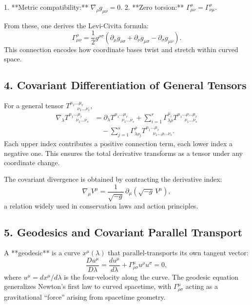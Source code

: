\documentclass[11pt,oneside]{book}
\numberwithin{equation}{chapter}
\begin{document}
1. **Metric compatibility:** $\nabla_\rho g_{\mu\nu} = 0$.  
2. **Zero torsion:** $\Gamma^\rho_{\mu\nu} = \Gamma^\rho_{\nu\mu}$.

From these, one derives the Levi-Civita formula:
\begin{equation}
\Gamma^\rho_{\mu\nu}
= \frac{1}{2} g^{\rho\sigma}
(\partial_\mu g_{\nu\sigma}
+ \partial_\nu g_{\mu\sigma}
- \partial_\sigma g_{\mu\nu}).
\end{equation}
This connection encodes how coordinate bases twist and stretch within curved space.

\subsection*{4. Covariant Differentiation of General Tensors}

For a general tensor $T^{\mu_1\ldots \mu_r}_{\ \ \ \ \ \ \ \nu_1\ldots\nu_s}$,
\begin{align}
\nabla_\lambda
T^{\mu_1\ldots \mu_r}_{\ \ \ \ \ \ \ \nu_1\ldots\nu_s}
&=
\partial_\lambda
T^{\mu_1\ldots \mu_r}_{\ \ \ \ \ \ \ \nu_1\ldots\nu_s}
+ \sum_{i=1}^r
\Gamma^{\mu_i}_{\lambda\rho}
T^{\mu_1\ldots \rho \ldots \mu_r}_{\ \ \ \ \ \ \ \nu_1\ldots\nu_s} \\
&\quad
- \sum_{j=1}^s
\Gamma^{\rho}_{\lambda\nu_j}
T^{\mu_1\ldots \mu_r}_{\ \ \ \ \ \ \ \nu_1\ldots \rho \ldots\nu_s}.
\end{align}
Each upper index contributes a positive connection term, each lower index a negative one.  
This ensures the total derivative transforms as a tensor under any coordinate change.

The covariant divergence is obtained by contracting the derivative index:
\begin{equation}
\nabla_\mu V^\mu = \frac{1}{\sqrt{-g}}\,
\partial_\mu(\sqrt{-g}\,V^\mu),
\end{equation}
a relation widely used in conservation laws and action principles.

\subsection*{5. Geodesics and Covariant Parallel Transport}

A **geodesic** is a curve $x^\mu(\lambda)$ that parallel-transports its own tangent vector:
\begin{equation}
\frac{D u^\mu}{D\lambda}
= \frac{d u^\mu}{d\lambda}
+ \Gamma^\mu_{\rho\sigma}u^\rho u^\sigma
= 0,
\end{equation}
where $u^\mu = dx^\mu/d\lambda$ is the four-velocity along the curve.  
The geodesic equation generalizes Newton’s first law to curved spacetime, with $\Gamma^\mu_{\rho\sigma}$ acting as a gravitational “force” arising from spacetime geometry.  
\end{document}
